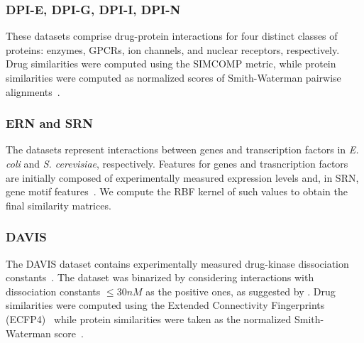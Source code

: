 \subsubsection{DPI-E, DPI-G, DPI-I, DPI-N}

These datasets comprise drug-protein interactions for four distinct classes of proteins: enzymes, GPCRs, ion channels, and nuclear receptors, respectively. Drug similarities were computed using the SIMCOMP metric, while protein similarities were computed as normalized scores of Smith-Waterman pairwise alignments~\cite{yamanishi2008prediction}.

\subsubsection{ERN and SRN}
The datasets represent interactions between genes and transcription factors in \textit{E. coli} and \textit{S. cerevisiae}, respectively. Features for genes and trasncription factors are initially composed of experimentally measured expression levels and, in SRN, gene motif features~\cite{brohee2011unraveling,schrynemackers2015classifying}. We compute the RBF kernel of such values to obtain the final similarity matrices. %

\subsubsection{DAVIS}
The DAVIS dataset contains experimentally measured drug-kinase dissociation constants~\cite{davis2011comprehensive}. The dataset was binarized by considering interactions with dissociation constants $\le 30 nM$ as the positive ones, as suggested by \cite{pahikkala2015more}. Drug similarities were computed using the Extended Connectivity Fingerprints (ECFP4)~\cite{rogers2005using,pahikkala2015more} while protein similarities were taken as the normalized Smith-Waterman score~\cite{yamanishi2008prediction,pahikkala2015more}.

